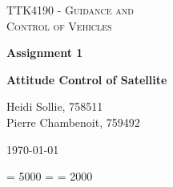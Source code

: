 \documentclass[12pt,a4paper]{article}
\title{\MyFag}
\title{\MyTitle{}}
\date{\today}
\author{}
\begin{document}
\begin{titlepage}
	\centering
	\vspace{1cm}
	{\scshape\Large TTK4190 - Guidance and \\Control of Vehicles\par}
	\vspace{1.5cm}
	{\huge\bfseries Assignment 1\par}
	\vspace{0.25cm}
	{\Large\bfseries Attitude Control of Satellite\par}
	\vspace{2cm}
	{\Large Heidi Sollie, 758511\\Pierre Chambenoit, 759492\par}
    \vfill
	{\large \today\par}
\end{titlepage}

\tolerance = 5000
\hbadness = \tolerance
\pretolerance = 2000



\newpage
\setcounter{page}{1}










\newpage
\printbibliography
\end{document}
